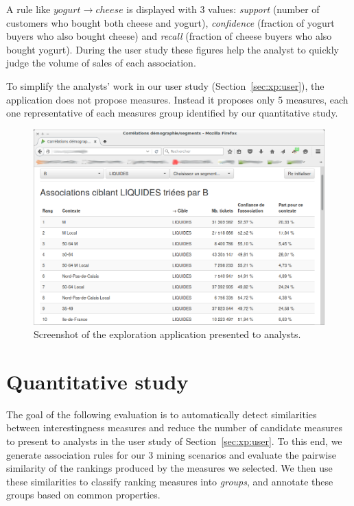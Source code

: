 A rule like $\mathit{yogurt}\rightarrow\mathit{cheese}$ is displayed with 3 values:
\emph{support} (number of customers who bought both cheese and yogurt),
\emph{confidence} (fraction of yogurt buyers who also bought cheese)
and \emph{recall} (fraction of cheese buyers who also bought yogurt).
During the user study these figures help the analyst to quickly judge the volume of sales of each association.

To simplify the analysts' work in our user study (Section~\ref{sec:xp:user}),
the application does not propose \nbm measures.
Instead it proposes only 5 measures,
each one representative of each measures group identified by our quantitative study.

\begin{figure}
  \centering
  \includegraphics[width=\textwidth]{fig/screenshot_exploration.png}
  \caption{\label{fig:capa:screenshot}Screenshot of the exploration application presented to analysts.}
\end{figure}








\section{Quantitative study}
\label{sec:xp:empirical}

The goal of the following evaluation is to automatically detect similarities between
interestingness measures and reduce the number of candidate measures to present to analysts in the user study of Section~\ref{sec:xp:user}.
To this end, we generate association rules for our 3 mining scenarios
and evaluate the pairwise similarity of the \nbm rankings produced by the measures we selected.
We then use these similarities to classify ranking measures into \emph{groups},
and annotate these groups based on common properties.

